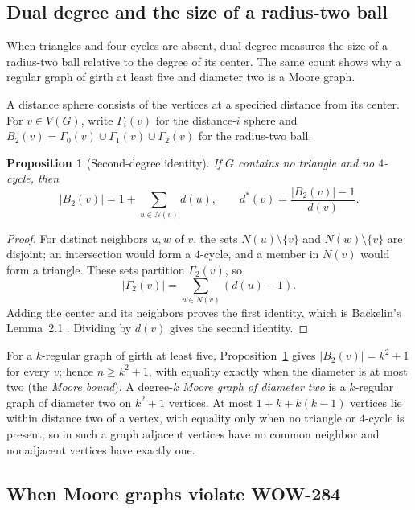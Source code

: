 \documentclass[a4paper,10pt,reqno]{amsart}
\theoremstyle{plain}
\newtheorem{proposition}[theorem]{Proposition}
\theoremstyle{definition}
\theoremstyle{remark}
\begin{document}
\subsection{Dual degree and the size of a radius-two ball}

When triangles and four-cycles are absent, dual degree measures the size
of a radius-two ball relative to the degree of its center. The same count
shows why a regular graph of girth at least five and diameter two is a
Moore graph.

A distance sphere consists of the vertices at a specified distance from
its center. For \(v\in V(G)\), write \(\Gamma_i(v)\) for the distance-\(i\) sphere and
\(B_2(v)=\Gamma_0(v)\cup\Gamma_1(v)\cup\Gamma_2(v)\) for the radius-two ball.

\begin{proposition}[Second-degree identity]\label{prop:radius-two}
If \(G\) contains no triangle and no \(4\)-cycle, then
\[
 |B_2(v)|=1+\sum_{u\in N(v)}d(u),
 \qquad
 d^*(v)=\frac{|B_2(v)|-1}{d(v)}.
\]
\end{proposition}

\begin{proof}
For distinct neighbors \(u,w\) of \(v\), the sets
\(N(u)\setminus\{v\}\) and \(N(w)\setminus\{v\}\) are disjoint; an
intersection would form a \(4\)-cycle, and a member in \(N(v)\) would form a
triangle.  These sets partition \(\Gamma_2(v)\), so
\[
 |\Gamma_2(v)|=\sum_{u\in N(v)}(d(u)-1).
\]
Adding the center and its neighbors proves the first identity, which is
Backelin's Lemma~2.1 \cite{Backelin2015}. Dividing by \(d(v)\) gives the
second identity.
\end{proof}

For a \(k\)-regular graph of girth at least five,
Proposition~\ref{prop:radius-two} gives \(|B_2(v)|=k^2+1\) for every \(v\);
hence \(n\ge k^2+1\), with equality exactly when the diameter is at most two
(the \emph{Moore bound}). A degree-\(k\) \emph{Moore graph of diameter two}
is a \(k\)-regular graph of diameter two on \(k^2+1\) vertices. At most
\(1+k+k(k-1)\) vertices lie within distance two of a vertex, with equality
only when no triangle or \(4\)-cycle is present; so in such a graph adjacent
vertices have no common neighbor and nonadjacent vertices have exactly one.

\subsection{When Moore graphs violate WOW-284}
\end{document}
